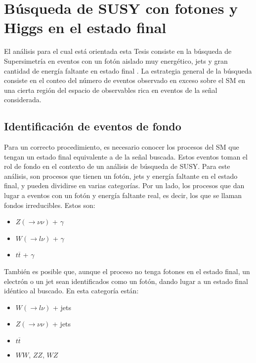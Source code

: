 \chapter{Búsqueda de SUSY con fotones y Higgs en el estado final}


El análisis para el cual está orientada esta Tesis consiste en la búsqueda de Supersimetría en eventos con un fotón aislado muy energético, jets y gran cantidad de energía faltante en estado final \cite{Alonso:2147473,ATLAS:2016fks,Collaboration:2198651}. La estrategia general de la búsqueda consiste en el conteo del número de eventos observado en exceso sobre el SM en una cierta región del espacio de observables rica en eventos de la señal considerada.


\section{Identificación de eventos de fondo}

Para un correcto procedimiento, es necesario conocer los procesos del SM que tengan un estado final equivalente a de la señal buscada. Estos eventos toman el rol de fondo en el contexto de un análisis de búsqueda de SUSY. Para este análisis, son procesos que tienen un fotón, jets y energía faltante en el estado final, y pueden dividirse en varias categorías. Por un lado, los procesos que dan lugar a eventos con un fotón y energía faltante real, es decir, los que se llaman fondos irreducibles. Estos son:

\begin{itemize}

	\item $Z(\rightarrow \nu\nu)$ + $\gamma$

	\item $W (\rightarrow l\nu)$ + $\gamma$

	\item $t \overline{t}$ + $\gamma$

\end{itemize}

También es posible que, aunque el proceso no tenga fotones en el estado final, un electrón o un jet sean identificados como un fotón, dando lugar a un estado final idéntico al buscado. En esta categoría están:

\begin{itemize}

	\item $W (\rightarrow l\nu)$ + jets

	\item $Z (\rightarrow \nu\nu)$ + jets

	\item $t \overline{t}$

	\item $WW$, $ZZ$, $WZ$

\end{itemize}

